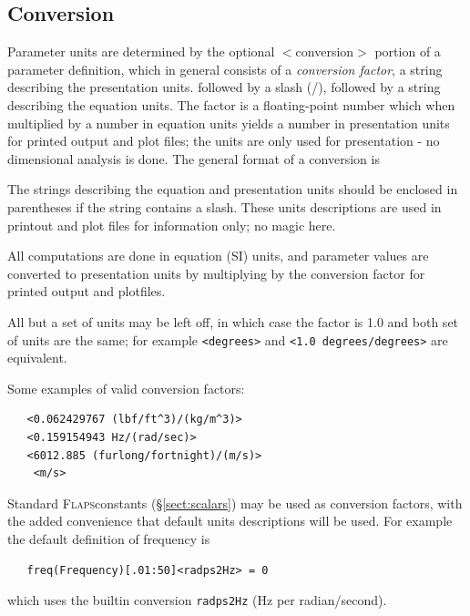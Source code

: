 \documentclass[11pt,openany,twoside]{book}
\numberwithin{equation}{section}		%
\newcommand{\Newterm}[1]{{\em #1}}	%
\newcommand{\Code}[1]{{\small\tt #1}}
\newcommand{\Subst}[1]{{\small\sf #1}}
\newcommand{\Flaps}{\textsc{Flaps\:}}
\newcommand{\Sectref}[1]{\S\ref{#1}}
\begin{document}
\subsection{Conversion}\label{sect:parunits}
Parameter units are determined by the optional
$<$\Subst{conversion}$>$\/ portion of a parameter
definition, which in general consists of a \Newterm{conversion factor},
a string describing the presentation units.
followed by a slash (/),
followed by a string describing the equation units.
The factor is a floating-point number which when multiplied by a number
in equation units yields a number in presentation units for
printed output and plot files; the units are
only used for presentation - no dimensional analysis is done.
The general format of a conversion is
\vspace{1.5ex}
\begin{center}
\fbox{$<$ \Subst{factor}\ (\Subst{presentation units})/(\Subst{equation units})$>$}
\end{center}
\vspace{1.5ex}
\par
The strings describing the equation and presentation units should be enclosed
in parentheses if the string contains a slash.
These units descriptions are used in printout and plot files
for information only; no magic here.
\par
All computations are done in equation (SI) units, and parameter
values are converted to presentation units by  multiplying by the
conversion factor for printed output and plotfiles.
\par
All but a set of units may be left off, in which case the factor is 1.0
and both set of units are the same; for example \Code{<degrees>} and
\Code{<1.0 degrees/degrees>} are equivalent.

Some examples of valid conversion factors:
\begin{lstlisting}
   <0.062429767 (lbf/ft^3)/(kg/m^3)>
   <0.159154943 Hz/(rad/sec)>
   <6012.885 (furlong/fortnight)/(m/s)>
	<m/s>
\end{lstlisting}
\par
Standard \Flaps constants (\Sectref{sect:scalars})
may be used as conversion factors, with the added convenience
that default units descriptions will be used. For example
the default definition of frequency is
\begin{lstlisting}
   freq(Frequency)[.01:50]<radps2Hz> = 0
\end{lstlisting}
which uses the builtin conversion \Code{radps2Hz} (Hz per radian/second).
\end{document}
